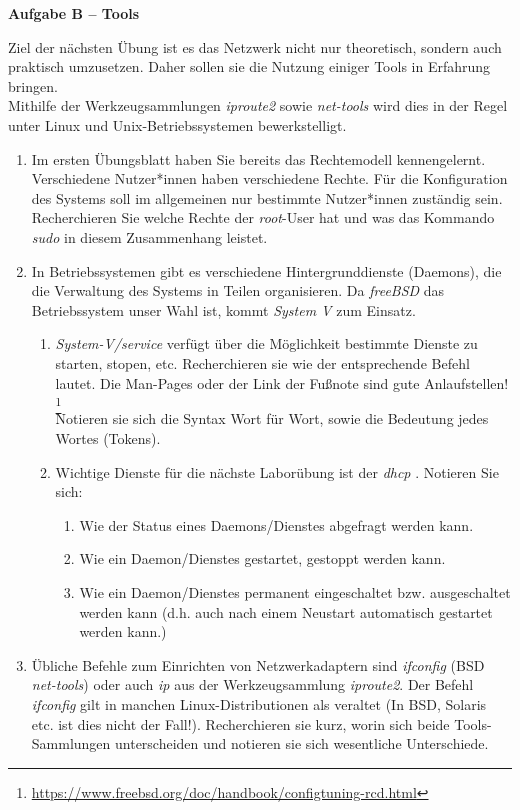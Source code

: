 \documentclass[paper=a4,fontsize=11pt]{scrartcl}%
\numberwithin{equation}{section}
\begin{document}
\begin{center}\Large{\textbf{Aufgabe B -- Tools}}\end{center}
Ziel der nächsten Übung ist es das Netzwerk nicht nur theoretisch, sondern auch praktisch umzusetzen. Daher sollen sie die Nutzung einiger Tools in Erfahrung bringen.\\
Mithilfe der Werkzeugsammlungen \emph{iproute2} sowie \emph{net-tools} wird dies in der Regel unter Linux und Unix-Betriebssystemen bewerkstelligt.
\begin{enumerate}
	\item Im ersten Übungsblatt haben Sie bereits das Rechtemodell kennengelernt. Verschiedene Nutzer*innen haben verschiedene Rechte. Für die Konfiguration des Systems soll im allgemeinen nur bestimmte Nutzer*innen zuständig sein. Recherchieren Sie welche Rechte der \emph{root}-User hat und was das Kommando \emph{sudo} in diesem Zusammenhang leistet.
	\item In Betriebssystemen gibt es verschiedene Hintergrunddienste (Daemons), die die Verwaltung des Systems in Teilen organisieren. Da \emph{freeBSD} das Betriebssystem unser Wahl ist, kommt \emph{System V} zum Einsatz.
	\begin{enumerate}
		\item \emph{System-V/service} verfügt über die Möglichkeit bestimmte Dienste zu starten, stopen, etc. Recherchieren sie wie der entsprechende Befehl lautet. Die Man-Pages oder der Link der Fußnote sind gute Anlaufstellen!
		\footnote{\url{https://www.freebsd.org/doc/handbook/configtuning-rcd.html}}\\
		Notieren sie sich die Syntax Wort für Wort, sowie die Bedeutung jedes Wortes (Tokens). 
		\item Wichtige Dienste für die nächste Laborübung ist der \emph{dhcp} . Notieren Sie sich:
		\begin{enumerate}
			\item Wie der Status eines Daemons/Dienstes abgefragt werden kann.
			\item Wie ein Daemon/Dienstes gestartet, gestoppt werden kann.
			\item Wie ein Daemon/Dienstes permanent eingeschaltet bzw. ausgeschaltet werden kann (d.h. auch nach einem Neustart automatisch gestartet werden kann.)
		\end{enumerate}
	\end{enumerate}
	\item Übliche Befehle zum Einrichten von Netzwerkadaptern sind \emph{ifconfig} (BSD \emph{net-tools}) oder auch \emph{ip} aus der Werkzeugsammlung \emph{iproute2}. Der Befehl \emph{ifconfig} gilt in manchen Linux-Distributionen als veraltet (In BSD, Solaris etc. ist dies nicht der Fall!). Recherchieren sie kurz, worin sich beide Tools-Sammlungen unterscheiden und notieren sie sich wesentliche Unterschiede.

\end{enumerate}
\end{document}
